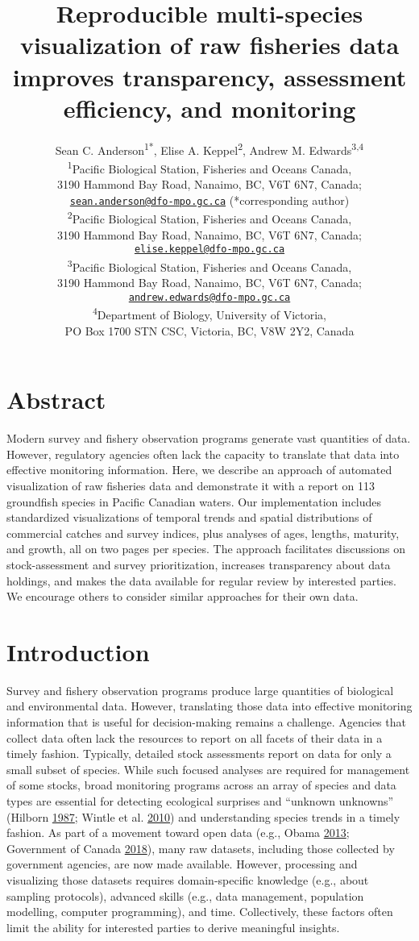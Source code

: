 \documentclass[12pt,]{article}
\title{Reproducible multi-species visualization of raw fisheries data improves transparency, assessment efficiency, and monitoring}
\author{Sean C. Anderson\textsuperscript{1*}, Elise A. Keppel\textsuperscript{2}, Andrew M. Edwards\textsuperscript{3,4}\\
\textsuperscript{1}Pacific Biological Station, Fisheries and Oceans Canada,\\
3190 Hammond Bay Road, Nanaimo, BC, V6T 6N7, Canada;\\
\href{mailto:sean.anderson@dfo-mpo.gc.ca}{\nolinkurl{sean.anderson@dfo-mpo.gc.ca}} (*corresponding author)\\
\textsuperscript{2}Pacific Biological Station, Fisheries and Oceans Canada,\\
3190 Hammond Bay Road, Nanaimo, BC, V6T 6N7, Canada;\\
\href{mailto:elise.keppel@dfo-mpo.gc.ca}{\nolinkurl{elise.keppel@dfo-mpo.gc.ca}}\\
\textsuperscript{3}Pacific Biological Station, Fisheries and Oceans Canada,\\
3190 Hammond Bay Road, Nanaimo, BC, V6T 6N7, Canada;\\
\href{mailto:andrew.edwards@dfo-mpo.gc.ca}{\nolinkurl{andrew.edwards@dfo-mpo.gc.ca}}\\
\textsuperscript{4}Department of Biology, University of Victoria,\\
PO Box 1700 STN CSC, Victoria, BC, V8W 2Y2, Canada}
\date{}
\begin{document}
\maketitle

\doublespacing
\setlength{\parindent}{0em}
\setlength{\parskip}{1.25em}


\clearpage

\hypertarget{abstract}{%
\section*{Abstract}\label{abstract}}

Modern survey and fishery observation programs generate vast quantities of
data. However, regulatory agencies often lack the capacity to translate that
data into effective monitoring information. Here, we describe an approach of
automated visualization of raw fisheries data and demonstrate it with a
report on 113 groundfish species in Pacific Canadian
waters. Our implementation includes standardized visualizations of temporal
trends and spatial distributions of commercial catches and survey indices, plus
analyses of ages, lengths, maturity, and growth, all on two pages per
species. The approach facilitates discussions on stock-assessment and survey
prioritization, increases transparency about data holdings, and makes the data
available for regular review by interested parties. We encourage others to
consider similar approaches for their own data.

\hypertarget{introduction}{%
\section*{Introduction}\label{introduction}}

Survey and fishery observation programs produce large quantities of biological and environmental data. However, translating those data into effective monitoring information that is useful for decision-making remains a challenge. Agencies that collect data often lack the resources to report on all facets of their data in a timely fashion. Typically, detailed stock assessments report on data for only a small subset of species. While such focused analyses are required for management of some stocks, broad monitoring programs across an array of species and data types are essential for detecting ecological surprises and ``unknown unknowns'' (Hilborn \protect\hyperlink{ref-hilborn1987}{1987}; Wintle et al. \protect\hyperlink{ref-wintle2010}{2010}) and understanding species trends in a timely fashion. As part of a movement toward open data (e.g., Obama \protect\hyperlink{ref-obama2013}{2013}; Government of Canada \protect\hyperlink{ref-canada2018}{2018}), many raw datasets, including those collected by government agencies, are now made available. However, processing and visualizing those datasets requires domain-specific knowledge (e.g., about sampling protocols), advanced skills (e.g., data management, population modelling, computer programming), and time. Collectively, these factors often limit the ability for interested parties to derive meaningful insights.
\end{document}
